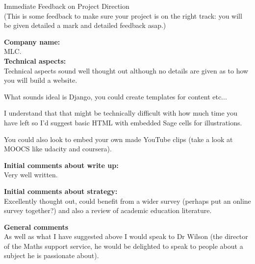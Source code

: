 \documentclass{article}
\begin{document}
\begin{center}
\Huge{Immediate Feedback on Project Direction}\\
\tiny{(This is some feedback to make sure your project is on the right track: you will be given detailed a mark and detailed feedback asap.)}
\end{center}


\normalsize
\textbf{Company name:}\\

MLC. \\

\textbf{Technical aspects:}\\

Technical aspects sound well thought out although no details are given as to how you will build a website.

What sounds ideal is Django, you could create templates for content etc...

I understand that that might be technically difficult with how much time you have left so I'd suggest basic HTML with embedded Sage cells for illustrations.

You could also look to embed your own made YouTube clips (take a look at MOOCS like udacity and coursera).


\textbf{Initial comments about write up:}\\

Very well written.

\textbf{Initial comments about strategy:}\\

Excellently thought out, could benefit from a wider survey (perhaps put an online survey together?) and also a review of academic education literature.

\textbf{General comments}\\

As well as what I have suggested above I would speak to Dr Wilson (the director of the Maths support service, he would be delighted to speak to people about a subject he is passionate about).
\end{document}
